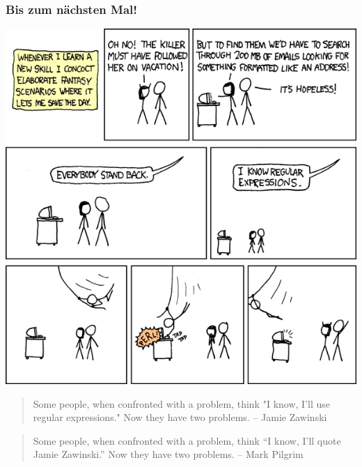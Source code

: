 \begin{frame}
\frametitle{Bis zum nächsten Mal!}
\begin{center}\includegraphics[height=0.6\textheight]{images/regular_expressions.png}\end{center}
\vspace{-0.5cm}

\small{\begin{quote}
Some people, when confronted with a problem, think "I know, I'll use regular expressions." Now they have two problems. -- Jamie Zawinski
\end{quote}}

\tiny{\begin{quote}
Some people, when confronted with a problem, think “I know, I’ll quote Jamie Zawinski.” Now they have two problems. -- Mark Pilgrim
\end{quote}}
\end{frame}


